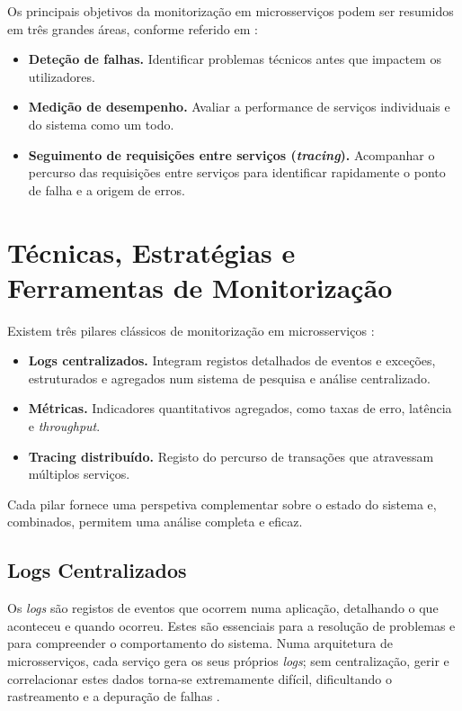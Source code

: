 Os principais objetivos da monitorização em microsserviços podem ser resumidos em três grandes áreas, conforme referido em \cite{Richardson2018}:

\begin{itemize}
    \item \textbf{Deteção de falhas.} Identificar problemas técnicos antes que impactem os utilizadores.
    
    \item \textbf{Medição de desempenho.} Avaliar a performance de serviços individuais e do sistema como um todo.
    
    \item \textbf{Seguimento de requisições entre serviços (\textit{tracing}).} Acompanhar o percurso das requisições entre serviços para identificar rapidamente o ponto de falha e a origem de erros.
\end{itemize}


\section{Técnicas, Estratégias e Ferramentas de Monitorização}

Existem três pilares clássicos de monitorização em microsserviços \cite{Soldani2018}:

\begin{itemize}
    \item \textbf{Logs centralizados.} Integram registos detalhados de eventos e exceções, estruturados e agregados num sistema de pesquisa e análise centralizado.
    \item \textbf{Métricas.} Indicadores quantitativos agregados, como taxas de erro, latência e \textit{throughput}.
    \item \textbf{Tracing distribuído.} Registo do percurso de transações que atravessam múltiplos serviços.
\end{itemize}

Cada pilar fornece uma perspetiva complementar sobre o estado do sistema e, combinados, permitem uma análise completa e eficaz.

\subsection{Logs Centralizados}

Os \textit{logs} são registos de eventos que ocorrem numa aplicação, detalhando o que aconteceu e quando ocorreu. Estes são essenciais para a resolução de problemas e para compreender o comportamento do sistema. Numa arquitetura de microsserviços, cada serviço gera os seus próprios \textit{logs}; sem centralização, gerir e correlacionar estes dados torna-se extremamente difícil, dificultando o rastreamento e a depuração de falhas \cite{Soldani2022}.


